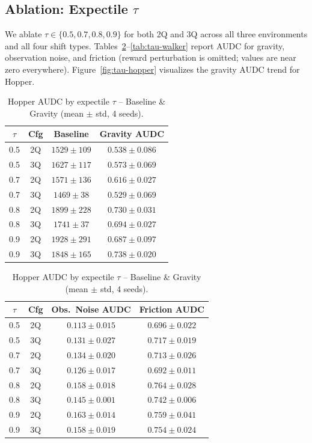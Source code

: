 \documentclass[conference]{IEEEtran}
\begin{document}
\subsection{Ablation: Expectile $\tau$}
\label{sec:tau-ablation}

We ablate $\tau \in \{0.5, 0.7, 0.8, 0.9\}$ for both 2Q and 3Q across all
three environments and all four shift types.
Tables~\ref{tab:tau-hopper}--\ref{tab:tau-walker} report AUDC for gravity,
observation noise, and friction (reward perturbation is omitted; values are
near zero everywhere). Figure~\ref{fig:tau-hopper} visualizes the gravity
AUDC trend for Hopper.

\begin{table}[t]
  \centering
  \caption{Hopper AUDC by expectile $\tau$ -- Baseline \& Gravity
           (mean $\pm$ std, 4 seeds).}
  \label{tab:tau-hopper}
  \small
  \begin{tabular}{cccc}
    \toprule
    $\tau$ & Cfg & Baseline & Gravity AUDC \\
    \midrule
    0.5 & 2Q & $1529\pm109$ & $0.538\pm0.086$ \\
    0.5 & 3Q & $1627\pm117$ & $0.573\pm0.069$ \\
    0.7 & 2Q & $1571\pm136$ & $0.616\pm0.027$ \\
    0.7 & 3Q & $1469\pm38$  & $0.529\pm0.069$ \\
    0.8 & 2Q & $1899\pm228$ & $0.730\pm0.031$ \\
    0.8 & 3Q & $1741\pm37$  & $0.694\pm0.027$ \\
    0.9 & 2Q & $1928\pm291$ & $0.687\pm0.097$ \\
    0.9 & 3Q & $1848\pm165$ & $0.738\pm0.020$ \\
    \bottomrule
  \end{tabular}

  \vspace{4pt}

  \begin{tabular}{cccc}
    \toprule
    $\tau$ & Cfg & Obs.\ Noise AUDC & Friction AUDC \\
    \midrule
    0.5 & 2Q & $0.113\pm0.015$ & $0.696\pm0.022$ \\
    0.5 & 3Q & $0.131\pm0.027$ & $0.717\pm0.019$ \\
    0.7 & 2Q & $0.134\pm0.020$ & $0.713\pm0.026$ \\
    0.7 & 3Q & $0.126\pm0.017$ & $0.692\pm0.011$ \\
    0.8 & 2Q & $0.158\pm0.018$ & $0.764\pm0.028$ \\
    0.8 & 3Q & $0.145\pm0.001$ & $0.742\pm0.006$ \\
    0.9 & 2Q & $0.163\pm0.014$ & $0.759\pm0.041$ \\
    0.9 & 3Q & $0.158\pm0.019$ & $0.754\pm0.024$ \\
    \bottomrule
  \end{tabular}
\end{table}
\end{document}
